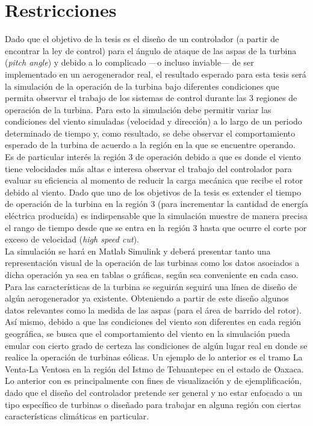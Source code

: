 \section{Restricciones}
{\parindent0pt
Dado que el objetivo de la tesis es el diseño de un controlador (a partir de encontrar la ley de control) para el ángulo de ataque de las aspas de la turbina (\emph{pitch angle}) y debido a lo complicado —o incluso inviable— de ser implementado en un aerogenerador real, el resultado esperado para esta tesis será la simulación de la operación de la turbina bajo diferentes condiciones que permita observar el trabajo de los sistemas de control durante las 3 regiones de operación de la turbina. Para esto la simulación debe permitir variar las condiciones del viento simuladas (velocidad y dirección) a lo largo de un periodo determinado de tiempo y, como resultado, se debe observar el comportamiento esperado de la turbina de acuerdo a la región en la que se encuentre operando. 
\\

Es de particular interés la región 3 de operación debido a que es donde el viento tiene velocidades más altas e interesa observar el trabajo del controlador para evaluar su eficiencia al momento de reducir la carga mecánica que recibe el rotor debido al viento. Dado que uno de los objetivos de la tesis es extender el tiempo de operación de la turbina en la región 3 (para incrementar la cantidad de energía eléctrica producida) es indispensable que la simulación muestre de manera precisa el rango de tiempo desde que se entra en la región 3 hasta que ocurre el corte por exceso de velocidad (\emph{high speed cut}).
\\

La simulación se hará en Matlab Simulink y deberá presentar tanto una representación visual de la operación de las turbinas como los datos asociados a dicha operación ya sea en tablas o gráficas, según sea conveniente en cada caso. Para las características de la turbina se seguirán seguirá una línea de diseño de algún aerogenerador ya existente. Obteniendo a partir de este diseño algunos datos relevantes como la medida de las aspas (para el área de barrido del rotor). Así mismo, debido a que las condiciones del viento son diferentes en cada región geográfica, se busca que el comportamiento del viento en la simulación pueda emular con cierto grado de certeza las condiciones de algún lugar real en donde se realice la operación de turbinas eólicas. Un ejemplo de lo anterior es el tramo La Venta-La Ventosa en la región del Istmo de Tehuantepec en el estado de Oaxaca.
\\

Lo anterior con es principalmente con fines de visualización y de ejemplificación, dado que el diseño del controlador pretende ser general y no estar enfocado a un tipo específico de turbinas o diseñado para trabajar en alguna región con ciertas características climáticas en particular. 

}
